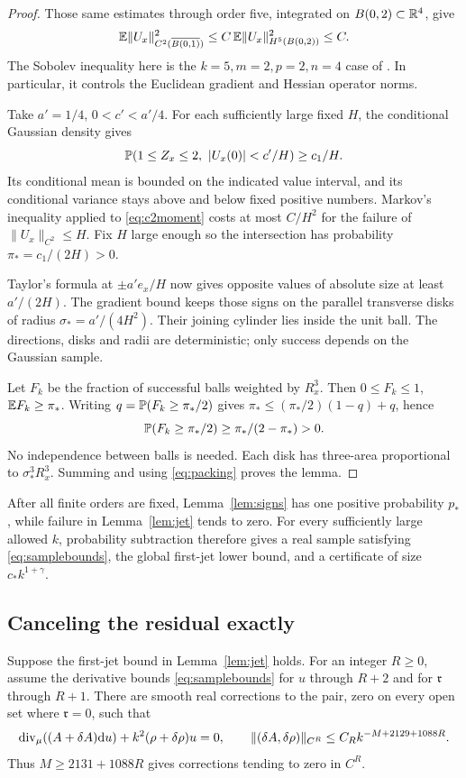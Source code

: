 \begin{proof}
Those same estimates through order five, integrated on
\(B(0,2)\subset\mathbb R^4\), give
\begin{equation}\label{eq:c2moment}
 \mathbb E\|U_x\|_{C^2(\overline{B(0,1)})}^2
 \le C\,\mathbb E\|U_x\|_{H^5(B(0,2))}^2\le C.
\end{equation}
The Sobolev inequality here is the \(k=5,m=2,p=2,n=4\)
case of \cite[Theorem~3.49, p.~76]{Hunter}.
In particular, it controls the Euclidean gradient and
Hessian operator norms.

Take \(a'=1/4\), \(0<c'<a'/4\). For each sufficiently large
fixed \(H\), the conditional Gaussian density gives
\[
 \mathbb P(1\le Z_x\le2,\ |U_x(0)|<c'/H)\ge c_1/H.
\]
Its conditional mean is bounded on the indicated value interval,
and its conditional variance stays above and below fixed
positive numbers. Markov's inequality applied to
\eqref{eq:c2moment} costs at most \(C/H^2\) for the
failure of \(\|U_x\|_{C^2}\le H\).
Fix \(H\) large enough so the intersection has probability
\(\pi_*=c_1/(2H)>0\).

Taylor's formula at \(\pm a'e_x/H\) now gives opposite
values of absolute size at least \(a'/(2H)\).
The gradient bound keeps those signs on the parallel transverse
disks of radius \(\sigma_*=a'/(4H^2)\).
Their joining cylinder lies inside the unit ball.
The directions, disks and radii are deterministic; only success
depends on the Gaussian sample.

Let \(F_k\) be the fraction of successful balls weighted by
\(R_x^3\). Then \(0\le F_k\le1\), \(\mathbb E F_k\ge\pi_*\).
Writing \(q=\mathbb P(F_k\ge\pi_*/2)\) gives
\(\pi_*\le(\pi_*/2)(1-q)+q\), hence
\[
 \mathbb P(F_k\ge\pi_*/2)\ge\pi_* /(2-\pi_*)>0.
\]
No independence between balls is needed.
Each disk has three-area proportional to
\(\sigma_*^3R_x^3\). Summing and using \eqref{eq:packing}
proves the lemma.
\end{proof}

After all finite orders are fixed, Lemma~\ref{lem:signs}
has one positive probability \(p_*\), while failure in
Lemma~\ref{lem:jet} tends to zero.
For every sufficiently large allowed \(k\), probability
subtraction therefore gives a real sample satisfying
\eqref{eq:samplebounds}, the global first-jet lower bound,
and a certificate of size \(c_*k^{1+\gamma}\).

\subsection{Canceling the residual exactly}

\begin{lemma}\label{lem:repair}
Suppose the first-jet bound in Lemma~\ref{lem:jet} holds.
For an integer \(R\ge0\), assume the derivative bounds
\eqref{eq:samplebounds} for \(u\) through \(R+2\) and for
\(\mathfrak r\) through \(R+1\). There are smooth real corrections
to the pair, zero on every open set where \(\mathfrak r=0\), such that
\[
 \operatorname{div}_\mu((A+\delta A)\mathrm d u)+k^2(\rho+\delta\rho)u=0,\qquad
 \|(\delta A,\delta\rho)\|_{C^R}
       \le C_Rk^{-M+2129+1088R}.
\]
Thus \(M\ge2131+1088R\) gives corrections tending to zero in \(C^R\).
\end{lemma}

